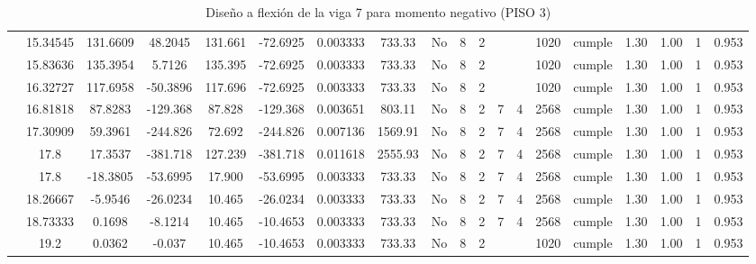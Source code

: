 \begin{table}[H]
{\begin{tabular}{|c|c|c|c|c|c|r|c|c|c|c|c|c|c|c|c|c|c|c|}
\cline{2-19}        & 15.34545 & 131.6609 & 48.2045 & 131.661 & -72.6925 & 0.003333 & 733.33 & No  & 8   & 2   &     &     & 1020 & \cellcolor[rgb]{ .776,  .937,  .808}cumple & 1.30 & 1.00 & 1   & 0.953 \bigstrut\\
\cline{2-19}        & 15.83636 & 135.3954 & 5.7126 & 135.395 & -72.6925 & 0.003333 & 733.33 & No  & 8   & 2   &     &     & 1020 & \cellcolor[rgb]{ .776,  .937,  .808}cumple & 1.30 & 1.00 & 1   & 0.953 \bigstrut\\
\cline{2-19}        & 16.32727 & 117.6958 & -50.3896 & 117.696 & -72.6925 & 0.003333 & 733.33 & No  & 8   & 2   &     &     & 1020 & \cellcolor[rgb]{ .776,  .937,  .808}cumple & 1.30 & 1.00 & 1   & 0.953 \bigstrut\\
\cline{2-19}        & 16.81818 & 87.8283 & -129.368 & 87.828 & -129.368 & 0.003651 & 803.11 & No  & 8   & 2   & 7   & 4   & 2568 & \cellcolor[rgb]{ .776,  .937,  .808}cumple & 1.30 & 1.00 & 1   & 0.953 \bigstrut\\
\cline{2-19}        & 17.30909 & 59.3961 & -244.826 & 72.692 & -244.826 & 0.007136 & 1569.91 & No  & 8   & 2   & 7   & 4   & 2568 & \cellcolor[rgb]{ .776,  .937,  .808}cumple & 1.30 & 1.00 & 1   & 0.953 \bigstrut\\
\cline{2-19}        & \cellcolor[rgb]{ .851,  .882,  .949}17.8 & 17.3537 & -381.718 & 127.239 & -381.718 & 0.011618 & 2555.93 & No  & 8   & 2   & 7   & 4   & 2568 & \cellcolor[rgb]{ .776,  .937,  .808}cumple & 1.30 & 1.00 & 1   & 0.953 \bigstrut\\
\cline{2-19}        & \cellcolor[rgb]{ .851,  .882,  .949}17.8 & -18.3805 & -53.6995 & 17.900 & -53.6995 & 0.003333 & 733.33 & No  & 8   & 2   & 7   & 4   & 2568 & \cellcolor[rgb]{ .776,  .937,  .808}cumple & 1.30 & 1.00 & 1   & 0.953 \bigstrut\\
\cline{2-19}        & 18.26667 & -5.9546 & -26.0234 & 10.465 & -26.0234 & 0.003333 & 733.33 & No  & 8   & 2   & 7   & 4   & 2568 & \cellcolor[rgb]{ .776,  .937,  .808}cumple & 1.30 & 1.00 & 1   & 0.953 \bigstrut\\
\cline{2-19}        & 18.73333 & 0.1698 & -8.1214 & 10.465 & -10.4653 & 0.003333 & 733.33 & No  & 8   & 2   & 7   & 4   & 2568 & \cellcolor[rgb]{ .776,  .937,  .808}cumple & 1.30 & 1.00 & 1   & 0.953 \bigstrut\\
\cline{2-19}        & 19.2 & 0.0362 & -0.037 & 10.465 & -10.4653 & 0.003333 & 733.33 & No  & 8   & 2   &     &     & 1020 & \cellcolor[rgb]{ .776,  .937,  .808}cumple & 1.30 & 1.00 & 1   & 0.953 \bigstrut\\
    \hline
    \end{tabular}%
 
  }
      \caption{Diseño a flexión de la viga 7 para momento negativo (PISO 3) }
  \label{tab:F VG7 P2 M-}%
\end{table}%
